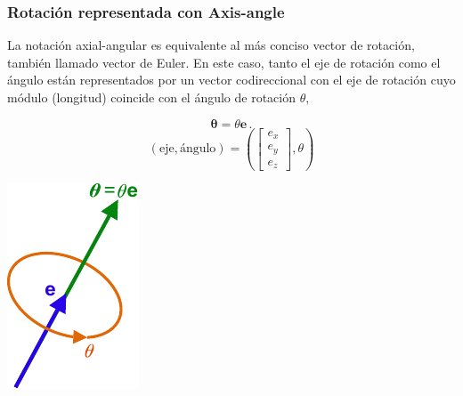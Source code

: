 \begin{frame}
    \frametitle{Rotación representada con Axis-angle}
    La notación axial-angular es equivalente al más conciso vector de rotación, también llamado vector de Euler. En este caso, tanto el eje de rotación como el ángulo están representados por un vector codireccional con el eje de rotación cuyo módulo (longitud) coincide con el ángulo de rotación $\theta$,
    \begin{center}
        \begin{minipage}{0.38\linewidth}
        \small
        \begin{equation*}
            {\displaystyle {\boldsymbol {\theta }}=\theta \mathbf {e} \,.}
        \end{equation*}
        \begin{equation*}
            {\displaystyle (\mathrm {eje} ,\mathrm {\text{ángulo}} )=\left({\begin{bmatrix}e_{x}\\e_{y}\\e_{z}\end{bmatrix}},\theta \right)}
        \end{equation*}
        \end{minipage}
        \hspace{1em}
        \begin{minipage}{0.38\linewidth}
            \centering
            \includegraphics[width=0.5\columnwidth]{images/axis_angle_vector.pdf}
        \end{minipage}
    \end{center}


\end{frame}
